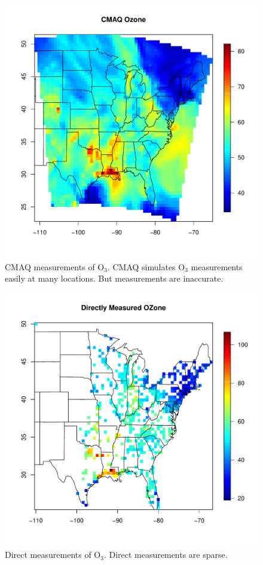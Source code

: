 \documentclass{article}                                                   %
\def\beginmyfig{\begin{figure}[htbp]\begin{center}}                       %
\def\endmyfig{\end{center}\end{figure}}                                   %
\begin{document}
  \beginmyfig
    \includegraphics{raw/cmaq.pdf}
    \caption{CMAQ measurements of O$_3$. CMAQ simulates O$_3$ measurements
             easily at many locations. But measurements are inaccurate.}
  \endmyfig

  \beginmyfig
    \includegraphics{raw/ozone.pdf}
    \caption{Direct measurements of O$_3$. Direct measurements are sparse.}
  \endmyfig
\end{document}
